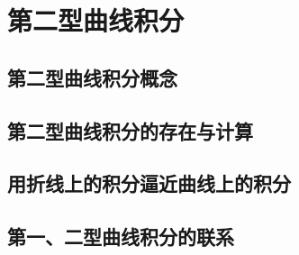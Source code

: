 \section{第二型曲线积分}
\subsection{第二型曲线积分概念}
\subsection{第二型曲线积分的存在与计算}
\subsection{用折线上的积分逼近曲线上的积分}
\subsection{第一、二型曲线积分的联系}
